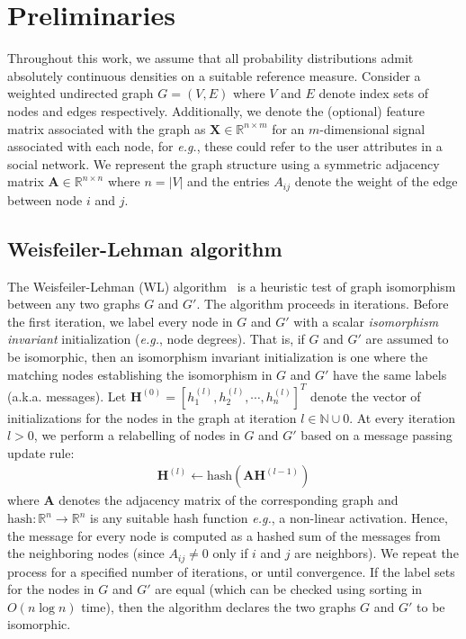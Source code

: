 \documentclass{article}
\begin{document}
 \section{Preliminaries}
Throughout this work, we assume that all probability distributions admit absolutely continuous densities on a suitable reference measure. 
Consider a weighted undirected graph $G=(V, E)$ where $V$ and $E$ denote index sets of nodes and edges respectively.
Additionally, we denote the (optional) feature matrix associated with the graph as $\mathbf{X}\in \mathbb{R}^{n \times m}$ for an $m$-dimensional signal associated with each node, for \textit{e.g.}, these could refer to the user attributes in a social network.
We represent the graph structure using a symmetric adjacency matrix $\mathbf{A} \in \mathbb{R}^{n \times n} $ where $n=\vert V \vert$ and the entries $A_{ij}$ denote the weight of the edge between node $i$ and $j$.

\subsection{Weisfeiler-Lehman algorithm}
The 
Weisfeiler-Lehman (WL) algorithm~\citep{weisfeiler1968reduction,douglas2011weisfeiler} is a heuristic test of graph isomorphism between any two graphs $G$ and $G'$. The algorithm proceeds in iterations. 
Before the first iteration, we label every node in $G$ and $G'$ with a scalar \textit{isomorphism invariant} initialization (\textit{e.g.}, node degrees). That is, if $G$ and $G'$ are assumed to be isomorphic, then an isomorphism invariant initialization is one where the matching nodes establishing the isomorphism in $G$ and $G'$ have the same labels (a.k.a. messages).
Let $\mathbf{H}^{(0)}=[h_1^{(l)}, h_2^{(l)}, \cdots, h_n^{(l)}]^T$ denote the vector of initializations 
for the nodes in the graph at iteration $l\in \mathbb{N} \cup 0$.
 At every iteration $l>0$, we perform a relabelling of nodes in $G$ and $G'$ based on a message passing update rule:
\begin{align}\label{eq:wl_mp}
\mathbf{H}^{(l)} \leftarrow \mathrm{hash}\left(\mathbf{A}\mathbf{H}^{(l-1)} \right)
\end{align}
where $\mathbf{A}$ denotes the adjacency matrix of the corresponding graph and $\mathrm{hash}:\mathbb{R}^n\to\mathbb{R}^n$ is any suitable hash function \textit{e.g.}, a non-linear activation. Hence, the message 
for every node is computed as a hashed sum of the messages from the neighboring nodes (since $A_{ij}\neq 0$ only if $i$ and $j$ are neighbors). We repeat the process for a specified number of iterations, or until convergence. If the label sets for the nodes in $G$ and $G'$ are equal (which can be checked using sorting in $O(n\log n)$ time), then the algorithm declares the two graphs $G$ and $G'$ to be isomorphic. 
\end{document}
